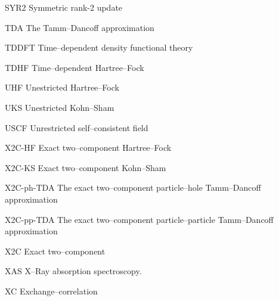 \begin{glossary}
  \item[SYR2]        Symmetric rank-2 update
  \item[TDA]         The Tamm--Dancoff approximation
  \item[TDDFT]       Time--dependent density functional theory
  \item[TDHF]        Time--dependent Hartree--Fock
  \item[UHF]         Unestricted Hartree--Fock
  \item[UKS]         Unestricted Kohn--Sham
  \item[USCF]        Unrestricted self--consistent field
  \item[X2C-HF]      Exact two--component Hartree--Fock
  \item[X2C-KS]      Exact two--component Kohn--Sham
  \item[X2C-ph-TDA]  The exact two--component particle--hole Tamm--Dancoff approximation
  \item[X2C-pp-TDA]  The exact two--component particle--particle Tamm--Dancoff approximation
  \item[X2C]         Exact two--component
  \item[XAS]         X--Ray absorption spectroscopy.
  \item[XC]          Exchange--correlation
\end{glossary}





